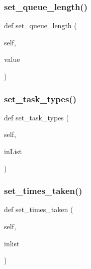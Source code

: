 \mbox{\label{classdynamicfilterapp_1_1models_1_1_predicate_adb36a52d2acdedc33d742d219e0acf7e}} 
\subsubsection{\texorpdfstring{set\_queue\_length()}{set\_queue\_length()}}
{\footnotesize\ttfamily def set\+\_\+queue\+\_\+length (\begin{DoxyParamCaption}\item[{}]{self,  }\item[{}]{value }\end{DoxyParamCaption})}

\mbox{\label{classdynamicfilterapp_1_1models_1_1_predicate_a8883240ed027ae492e788dc7a24ef227}} 
\subsubsection{\texorpdfstring{set\_task\_types()}{set\_task\_types()}}
{\footnotesize\ttfamily def set\+\_\+task\+\_\+types (\begin{DoxyParamCaption}\item[{}]{self,  }\item[{}]{in\+List }\end{DoxyParamCaption})}

\mbox{\label{classdynamicfilterapp_1_1models_1_1_predicate_a4adcbbe0cf32ef383818ee9043e61628}} 
\subsubsection{\texorpdfstring{set\_times\_taken()}{set\_times\_taken()}}
{\footnotesize\ttfamily def set\+\_\+times\+\_\+taken (\begin{DoxyParamCaption}\item[{}]{self,  }\item[{}]{inlist }\end{DoxyParamCaption})}

